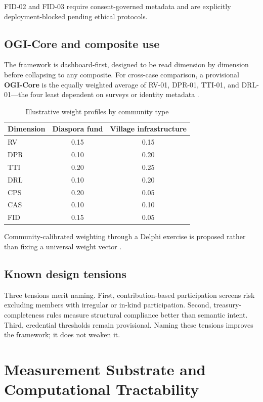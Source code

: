 \documentclass[sigconf]{acmart}
\begin{document}
FID-02 and FID-03 require consent-governed metadata and are explicitly deployment-blocked pending ethical protocols.

\subsection{OGI-Core and composite use}

The framework is dashboard-first, designed to be read dimension by dimension before collapsing to any composite. For cross-case comparison, a provisional \textbf{OGI-Core} is the equally weighted average of RV-01, DPR-01, TTI-01, and DRL-01---the four least dependent on surveys or identity metadata \cite{nardo2008,oman2006}.

\begin{table}[h]
\caption{Illustrative weight profiles by community type}
\label{tab:weights}
\small
\begin{tabular}{lcc}
\toprule
Dimension & Diaspora fund & Village infrastructure \\
\midrule
RV  & 0.15 & 0.15 \\
DPR & 0.10 & 0.20 \\
TTI & 0.20 & 0.25 \\
DRL & 0.10 & 0.20 \\
CPS & 0.20 & 0.05 \\
CAS & 0.10 & 0.10 \\
FID & 0.15 & 0.05 \\
\bottomrule
\end{tabular}
\end{table}

Community-calibrated weighting through a Delphi exercise is proposed rather than fixing a universal weight vector \cite{quyen2014}.

\subsection{Known design tensions}

Three tensions merit naming. First, contribution-based participation screens risk excluding members with irregular or in-kind participation. Second, treasury-completeness rules measure structural compliance better than semantic intent. Third, credential thresholds remain provisional. Naming these tensions improves the framework; it does not weaken it.

\section{Measurement Substrate and Computational Tractability}
\end{document}
